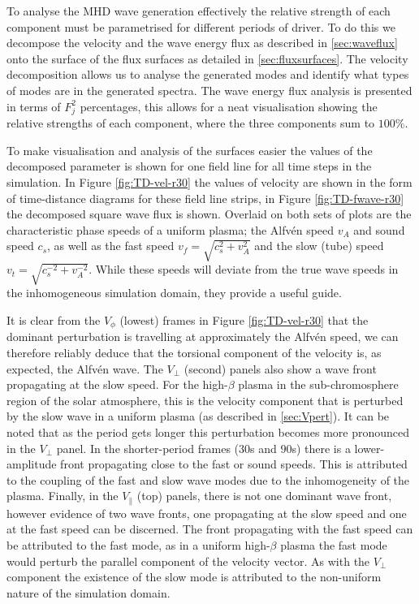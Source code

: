 To analyse the MHD wave generation effectively the relative strength of each component must be parametrised for different periods of driver.
To do this we decompose the velocity and the wave energy flux as described in \cref{sec:waveflux} onto the surface of the flux surfaces as detailed in \cref{sec:fluxsurfaces}.
The velocity decomposition allows us to analyse the generated modes and identify what types of modes are in the generated spectra.
The wave energy flux analysis is presented in terms of $F^2_j$ percentages, this allows for a neat visualisation showing the relative strengths of each component, where the three components sum to $100\%$.

To make visualisation and analysis of the surfaces easier the values of the decomposed parameter is shown for one field line for all time steps in the simulation.
In Figure \ref{fig:TD-vel-r30} the values of velocity are shown in the form of time-distance diagrams for these field line strips, in Figure \ref{fig:TD-fwave-r30} the decomposed square wave flux is shown. Overlaid on both sets of plots are the characteristic phase speeds of a uniform plasma; the Alfv\'en speed $v_A$ and sound speed $c_s$, as well as the fast speed $v_f = \sqrt{c_s^2 + v_A^2}$ and the slow (tube) speed $v_t = \sqrt{c_s^{-2} + v_A^{-2}}$.
While these speeds will deviate from the true wave speeds in the inhomogeneous simulation domain, they provide a useful guide.

It is clear from the $V_\phi$ (lowest) frames in Figure \ref{fig:TD-vel-r30} that the dominant perturbation is travelling at approximately the Alfv\'en speed, we can therefore reliably deduce that the torsional component of the velocity is, as expected, the Alfv\'en wave.
The $V_\perp$ (second) panels also show a wave front propagating at the slow speed. For the high-$\beta$ plasma in the sub-chromosphere region of the solar atmosphere, this is the velocity component that is perturbed by the slow wave in a uniform plasma (as described in \cref{sec:Vpert}).
It can be noted that as the period gets longer this perturbation becomes more pronounced in the $V_\perp$ panel.
In the shorter-period frames ($30$s and $90$s) there is a lower-amplitude front propagating close to the fast or sound speeds.
This is attributed to the coupling of the fast and slow wave modes due to the inhomogeneity of the plasma.
Finally, in the $V_\parallel$ (top) panels, there is not one dominant wave front, however evidence of two wave fronts, one propagating at the slow speed and one at the fast speed can be discerned.
The front propagating with the fast speed can be attributed to the fast mode, as in a uniform high-$\beta$ plasma the fast mode would perturb the parallel component of the velocity vector.
As with the $V_\perp$ component the existence of the slow mode is attributed to the non-uniform nature of the simulation domain.


